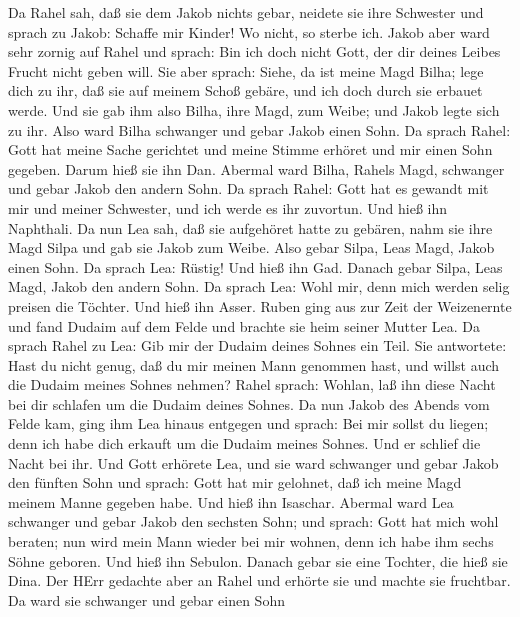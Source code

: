  Da Rahel sah, daß sie dem Jakob nichts gebar, neidete sie
ihre Schwester und sprach zu Jakob: Schaffe mir Kinder! Wo nicht, so
sterbe ich.  Jakob aber ward sehr zornig auf Rahel und
sprach: Bin ich doch nicht Gott, der dir deines Leibes Frucht nicht
geben will.  Sie aber sprach: Siehe, da ist meine Magd
Bilha; lege dich zu ihr, daß sie auf meinem Schoß gebäre, und ich doch
durch sie erbauet werde.  Und sie gab ihm also Bilha, ihre
Magd, zum Weibe; und Jakob legte sich zu ihr.  Also ward
Bilha schwanger und gebar Jakob einen Sohn.  Da sprach
Rahel: Gott hat meine Sache gerichtet und meine Stimme erhöret und mir
einen Sohn gegeben. Darum hieß sie ihn Dan.  Abermal ward
Bilha, Rahels Magd, schwanger und gebar Jakob den andern Sohn.
 Da sprach Rahel: Gott hat es gewandt mit mir und meiner
Schwester, und ich werde es ihr zuvortun. Und hieß ihn Naphthali.
 Da nun Lea sah, daß sie aufgehöret hatte zu gebären, nahm
sie ihre Magd Silpa und gab sie Jakob zum Weibe.  Also
gebar Silpa, Leas Magd, Jakob einen Sohn.  Da sprach Lea:
Rüstig! Und hieß ihn Gad.  Danach gebar Silpa, Leas Magd,
Jakob den andern Sohn.  Da sprach Lea: Wohl mir, denn mich
werden selig preisen die Töchter. Und hieß ihn Asser. 
Ruben ging aus zur Zeit der Weizenernte und fand Dudaim auf dem Felde
und brachte sie heim seiner Mutter Lea. Da sprach Rahel zu Lea: Gib mir
der Dudaim deines Sohnes ein Teil.  Sie antwortete: Hast du
nicht genug, daß du mir meinen Mann genommen hast, und willst auch die
Dudaim meines Sohnes nehmen? Rahel sprach: Wohlan, laß ihn diese Nacht
bei dir schlafen um die Dudaim deines Sohnes.  Da nun Jakob
des Abends vom Felde kam, ging ihm Lea hinaus entgegen und sprach: Bei
mir sollst du liegen; denn ich habe dich erkauft um die Dudaim meines
Sohnes. Und er schlief die Nacht bei ihr.  Und Gott
erhörete Lea, und sie ward schwanger und gebar Jakob den fünften Sohn
 und sprach: Gott hat mir gelohnet, daß ich meine Magd
meinem Manne gegeben habe. Und hieß ihn Isaschar.  Abermal
ward Lea schwanger und gebar Jakob den sechsten Sohn;  und
sprach: Gott hat mich wohl beraten; nun wird mein Mann wieder bei mir
wohnen, denn ich habe ihm sechs Söhne geboren. Und hieß ihn Sebulon.
 Danach gebar sie eine Tochter, die hieß sie Dina.
 Der HErr gedachte aber an Rahel und erhörte sie und machte
sie fruchtbar.  Da ward sie schwanger und gebar einen Sohn
